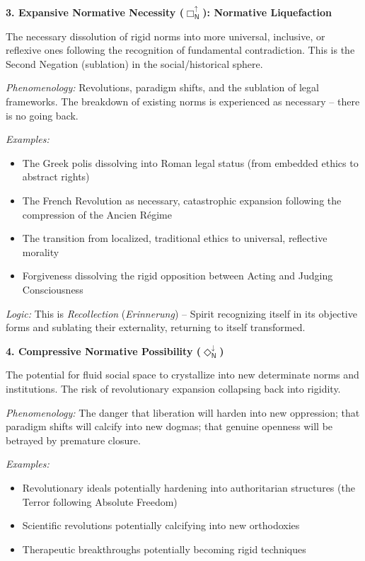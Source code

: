 \documentclass[12pt]{book}
\newcommand{\NBoxUp}{\Box_{\mathsf{N}}^{\uparrow}}
\newcommand{\NDiaDown}{\Diamond_{\mathsf{N}}^{\downarrow}}
\begin{document}
\bigskip

\noindent\textbf{3. Expansive Normative Necessity ($\NBoxUp$): Normative Liquefaction}

The necessary dissolution of rigid norms into more universal, inclusive, or reflexive ones following the recognition of fundamental contradiction. This is the Second Negation (sublation) in the social/historical sphere.

\textit{Phenomenology:} Revolutions, paradigm shifts, and the sublation of legal frameworks. The breakdown of existing norms is experienced as necessary -- there is no going back.

\textit{Examples:}
\begin{itemize}
\item The Greek polis dissolving into Roman legal status (from embedded ethics to abstract rights)
\item The French Revolution as necessary, catastrophic expansion following the compression of the Ancien Régime
\item The transition from localized, traditional ethics to universal, reflective morality
\item Forgiveness dissolving the rigid opposition between Acting and Judging Consciousness
\end{itemize}

\textit{Logic:} This is \textit{Recollection} (\emph{Erinnerung}) -- Spirit recognizing itself in its objective forms and sublating their externality, returning to itself transformed.

\bigskip

\noindent\textbf{4. Compressive Normative Possibility ($\NDiaDown$)}

The potential for fluid social space to crystallize into new determinate norms and institutions. The risk of revolutionary expansion collapsing back into rigidity.

\textit{Phenomenology:} The danger that liberation will harden into new oppression; that paradigm shifts will calcify into new dogmas; that genuine openness will be betrayed by premature closure.

\textit{Examples:}
\begin{itemize}
\item Revolutionary ideals potentially hardening into authoritarian structures (the Terror following Absolute Freedom)
\item Scientific revolutions potentially calcifying into new orthodoxies
\item Therapeutic breakthroughs potentially becoming rigid techniques
\end{itemize}
\end{document}
